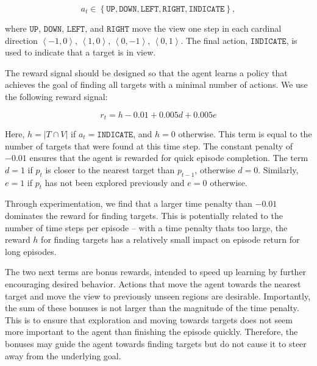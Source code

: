 \begin{equation}
    a_t \in \left\lbrace \mathtt{UP}, \mathtt{DOWN}, \mathtt{LEFT}, \mathtt{RIGHT}, \mathtt{INDICATE} \right\rbrace,
\end{equation}

where \(\mathtt{UP}\), \(\mathtt{DOWN}\), \(\mathtt{LEFT}\), and \(\mathtt{RIGHT}\) move the view one step in each cardinal direction \(\left\langle -1, 0 \right\rangle\), \(\left\langle 1, 0 \right\rangle\), \(\left\langle 0, -1 \right\rangle\), \(\left\langle 0, 1 \right\rangle\).
The final action, \(\mathtt{INDICATE}\), is used to indicate that a target is in view.

The reward signal should be designed so that the agent learns a policy that achieves the goal of finding all targets with a minimal number of actions.
We use the following reward signal:

\begin{equation}
    r_t = h - 0.01 + 0.005d + 0.005e
\end{equation}

Here, \(h = \left\lvert T \cap V \right\rvert\) if \(a_t = \mathtt{INDICATE}\), and \(h = 0\) otherwise.
This term is equal to the number of targets that were found at this time step.
The constant penalty of \(-0.01\) ensures that the agent is rewarded for quick episode completion.
The term \(d = 1\) if \(p_t\) is closer to the nearest target than \(p_{t-1}\), otherwise \(d = 0\).
Similarly, \(e = 1\) if \(p_t\) has not been explored previously and \(e = 0\) otherwise.

Through experimentation, we find that a larger time penalty than \(-0.01\) dominates the reward for finding targets.
This is potentially related to the number of time steps per episode -- with a time penalty thats too large, the reward \(h\) for finding targets has a relatively small impact on episode return for long episodes.

The two next terms are bonus rewards, intended to speed up learning by further encouraging desired behavior.
Actions that move the agent towards the nearest target and move the view to previously unseen regions are desirable.
Importantly, the sum of these bonuses is not larger than the magnitude of the time penalty.
This is to ensure that exploration and moving towards targets does not seem more important to the agent than finishing the episode quickly.
Therefore, the bonuses may guide the agent towards finding targets but do not cause it to steer away from the underlying goal.

